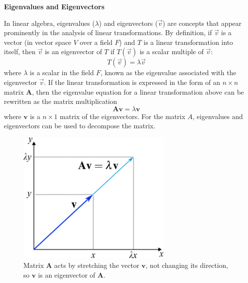 \documentclass[12pt,letter]{article}
\begin{document}
	

	

	

	\begin{review}
	
		\textbf{Eigenvalues and Eigenvectors}
	
		In linear algebra, eigenvalues ($\lambda$) and eigenvectors ($\vec{v}$) are concepts that appear prominently in the analysis of linear transformations. By definition, if  $\vec{v}$ is a vector (in vector space $V$ over a field $F$) and $T$ is a linear transformation into itself, then $\vec{v}$ is an eigenvector of $T$ if $T(\vec{v})$ is a scalar multiple of $\vec{v}$:
		\begin{equation}
		T(\vec{v}) = \lambda\vec{v}
		\end{equation}
		where $\lambda$ is a scalar in the field $F$, known as the eigenvalue associated with the eigenvector $\vec{v}$. If the linear transformation is expressed in the form of an $n \times n$ matrix $\textbf{A}$, then the eigenvalue equation for a linear transformation above can be rewritten as the matrix multiplication
		\begin{equation}
		\textbf{A}\textbf{v} = \lambda\textbf{v}
		\end{equation}
		where $\textbf{v}$ is a $n \times 1$ matrix of the eigenvectors. For the matrix $A$, eigenvalues and eigenvectors can be used to decompose the matrix.

		\begin{figure}[H]
			\centering
			\includegraphics[width=3in]{../figures/eigenvalues_2}
			\caption{Matrix $\textbf{A}$ acts by stretching the vector $\textbf{v}$, not changing its direction, so $\textbf{v}$ is an eigenvector of $\textbf{A}$.}
			\label{fig:eigenvalues}
		\end{figure}
		
			
	

\end{review}
\end{document}
